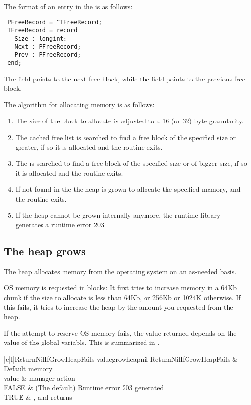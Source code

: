 The format of an entry in the  is as follows:

\begin{verbatim}
 PFreeRecord = ^TFreeRecord;
 TFreeRecord = record
   Size : longint;
   Next : PFreeRecord;
   Prev : PFreeRecord;
 end;

\end{verbatim}

The  field points to the next free block, while
the  field points to the previous free block.

The algorithm for allocating memory is as follows:

\begin{enumerate}
\item The size of the block to allocate is adjusted to a 16 (or 32) byte granularity.
\item The cached free list is searched to find a free block of the specified
 size or greater, if so it is allocated and the routine exits.
\item The  is searched to find a free block of the specified size
or of bigger size, if so it is allocated and the routine exits.
\item If not found in the  the heap is grown to allocate the
specified memory, and the routine exits.
\item If the heap cannot be grown internally anymore, the runtime library 
generates a runtime error 203.
\end{enumerate}


\subsection{The heap grows}
The heap allocates memory from the operating system on an as-needed basis.

OS memory is requested in blocks: It first tries to increase memory in a 64Kb 
chunk if the size to allocate is less than 64Kb, or 256Kb or 1024K otherwise.
If this fails, it tries to increase the heap by the amount you requested
from the heap.

If the attempt to reserve OS memory fails, the value returned depends on the
value of the  global variable. This is summarized
in .

\begin{FPCltable}{|c|l|}{ReturnNilIfGrowHeapFails value}{growheapnil}
\hline
  ReturnNilIfGrowHeapFails & Default memory \\
    value                  & manager action \\
\hline  
     FALSE	        & (The default) Runtime error 203 generated \\
     TRUE 		& ,  and  returns  \\
\hline
\end{FPCltable}

